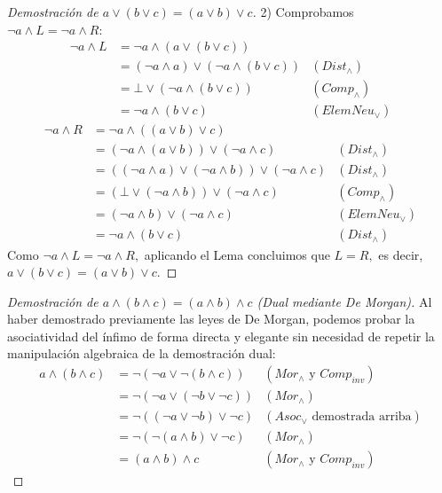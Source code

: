 {\begin{proof}[Demostración de $a \vee (b \vee c) = (a \vee b) \vee c$]
2) Comprobamos $\neg a \wedge L = \neg a \wedge R:$
\begin{align*}
    \neg a \wedge L &= \neg a \wedge (a \vee (b \vee c)) \\
                    &= (\neg a \wedge a) \vee (\neg a \wedge (b \vee c)) & (Dist_\wedge) \\
                    &= \bot \vee (\neg a \wedge (b \vee c)) & (Comp_\wedge) \\
                    &= \neg a \wedge (b \vee c) & (ElemNeu_\vee)
\end{align*}
\begin{align*}
    \neg a \wedge R &= \neg a \wedge ((a \vee b) \vee c) \\
                    &= (\neg a \wedge (a \vee b)) \vee (\neg a \wedge c) & (Dist_\wedge) \\
                    &= ((\neg a \wedge a) \vee (\neg a \wedge b)) \vee (\neg a \wedge c) & (Dist_\wedge) \\
                    &= (\bot \vee (\neg a \wedge b)) \vee (\neg a \wedge c) & (Comp_\wedge) \\
                    &= (\neg a \wedge b) \vee (\neg a \wedge c) & (ElemNeu_\vee) \\
                    &= \neg a \wedge (b \vee c) & (Dist_\wedge)
\end{align*}
Como $\neg a \wedge L = \neg a \wedge R,$ aplicando el Lema concluimos que $L = R,$ es decir, $a \vee (b \vee c) = (a \vee b) \vee c.$
\end{proof}

\begin{proof}[Demostración de $a \wedge (b \wedge c) = (a \wedge b) \wedge c$ (Dual mediante De Morgan)]
Al haber demostrado previamente las leyes de De Morgan, podemos probar la asociatividad del ínfimo de forma directa y elegante sin necesidad de repetir la manipulación algebraica de la demostración dual:
\begin{align*}
    a \wedge (b \wedge c) &= \neg (\neg a \vee \neg (b \wedge c)) & (Mor_\wedge \text{ y } Comp_{inv}) \\
                          &= \neg (\neg a \vee (\neg b \vee \neg c)) & (Mor_\wedge) \\
                          &= \neg ((\neg a \vee \neg b) \vee \neg c) & (Asoc_\vee \text{ demostrada arriba}) \\
                          &= \neg (\neg (a \wedge b) \vee \neg c) & (Mor_\wedge) \\
                          &= (a \wedge b) \wedge c & (Mor_\wedge \text{ y } Comp_{inv})
\end{align*}
\end{proof}
}

